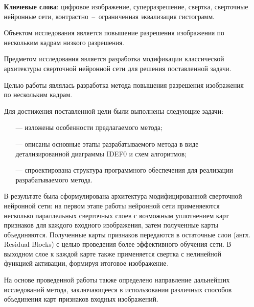 \begin{essay}{}
    \noindent\textbf{Ключевые слова}: цифровое изображение, суперразрешение, свертка, сверточные нейронные сети, контрастно~--~ограниченная эквализация гистограмм.

    Объектом исследования является повышение разрешения изображения по нескольким кадрам низкого разрешения.
    
    Предметом исследования является разработка модификации классической архитектуры сверточной нейронной сети для решения поставленной задачи.

    Целью работы являлась разработка метода повышения разрешения изображения по нескольким кадрам.

    Для достижения поставленной цели были выполнены следующие задачи:

    \begin{itemize}
        \item[---] изложены особенности предлагаемого метода;
        \item[---] описаны основные этапы разрабатываемого метода в виде детализированной диаграммы IDEF0 и схем алгоритмов;
        \item[---] спроектирована структура программного обеспечения для реализации разрабатываемого метода.
    \end{itemize}

    В результате была сформулирована архитектура модифицированной сверточной нейронной сети: на первом этапе работы нейронной сети применяеются несколько параллельных сверточных слоев с возможным уплотнением карт признаков для каждого входного изображения, затем полученные карты объединяются. Полученные карты признаков передаются в остаточные слои (англ. Residual Blocks) с целью проведения более эффективного обучения сети. В выходном слое к каждой карте также применяется свертка с нелинейной функцией активации, формируя итоговое изображение.
    
    На основе проведенной работы также определено направление дальнейших исследований метода, заключающееся в использовании различных способов объединения карт признаков входных изображений.
\end{essay}